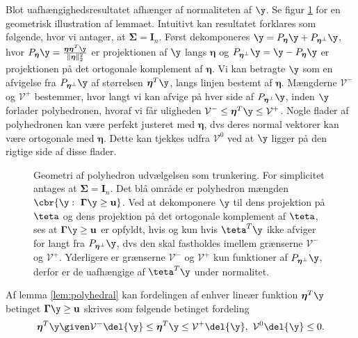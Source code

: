 Blot uafhængighedsresultatet afhænger af normaliteten af \(\y\).
Se figur \ref{fig:polyhedron} for en geometrisk illustration af lemmaet.
Intuitivt kan resultatet forklares som følgende, hvor vi antager, at \(\boldsymbol{\Sigma}= \mathbf{I}_n\).
Først dekomponeres \(\y=P_{\boldsymbol{\eta}} \y + P_{\boldsymbol{\eta}^\perp} \y\), hvor \(P_{\boldsymbol{\eta}} \y = \frac{\boldsymbol{\eta} \boldsymbol{\eta}^T \y}{\Vert \boldsymbol{\eta} \Vert_2^2}\) er projektionen af \(\y\) langs \(\boldsymbol{\eta}\) og \(P_{\boldsymbol{\eta}^\perp} \y = \y - P_{\boldsymbol{\eta}} \y\) er projektionen på det ortogonale komplement af \(\boldsymbol{\eta}\).
Vi kan betragte \(\y\) som en afvigelse fra \(P_{\boldsymbol{\eta}^\perp} \y\) af størrelsen \(\boldsymbol{\eta}^T \y\), langs linjen bestemt af \(\boldsymbol{\eta}\).
Mængderne \(\mathcal{V}^-\) og \(\mathcal{V}^+\) bestemmer, hvor langt vi kan afvige på hver side af \(P_{\boldsymbol{\eta}^\perp} \y\), inden \(\y\) forlader polyhedronen, hvoraf vi får uligheden \(\mathcal{V}^- \leq \boldsymbol{\eta}^T \y \leq \mathcal{V}^+\).
Nogle flader af polyhedronen kan være perfekt justeret med \(\boldsymbol{\eta}\), dvs deres normal vektorer kan være ortogonale med \(\boldsymbol{\eta}\).
Dette kan tjekkes udfra \(\mathcal{V}^0\) ved at \(\y\) ligger på den rigtige side af disse flader.  
%
\begin{figure}[H]
\centering
\scalebox{1}{}
\caption{Geometri af polyhedron udvælgelsen som trunkering. For simplicitet antages at \(\boldsymbol{\Sigma} = \mathbf{I}_n\). Det blå område er polyhedron mængden \(\cbr{\y : \ \boldsymbol{\Gamma} \y \geq \mathbf{u}}\).
Ved at dekomponere \(\y\) til dens projektion på \(\teta\) og dens projektion på det ortogonale komplement af \(\teta\), ses at \(\boldsymbol{\Gamma} \y \geq \mathbf{u}\) er opfyldt, hvis og kun hvis \(\teta^T \y\) ikke afviger for langt fra \(P_{\boldsymbol{\eta}^\perp} \y\), dvs den skal fastholdes imellem grænserne \(\mathcal{V}^-\) og \(\mathcal{V}^+\).
Yderligere er grænserne \(\mathcal{V}^-\) og \(\mathcal{V}^+\) kun funktioner af \(P_{\boldsymbol{\eta}^\perp} \y\), derfor er de uafhængige af \(\teta^T \y\) under normalitet.} \label{fig:polyhedron}
\end{figure}
%
Af lemma \ref{lem:polyhedral} kan fordelingen af enhver lineær funktion \(\boldsymbol{\eta}^T \y\) betinget \(\boldsymbol{\Gamma} \y \geq \mathbf{u}\) skrives som følgende betinget fordeling
\begin{align*}
\boldsymbol{\eta}^T \y \given \mathcal{V}^- \del{\y} \leq \boldsymbol{\eta}^T \y \leq \mathcal{V}^+ \del{\y}, \ \mathcal{V}^0 \del{\y} \leq 0.
\end{align*}
